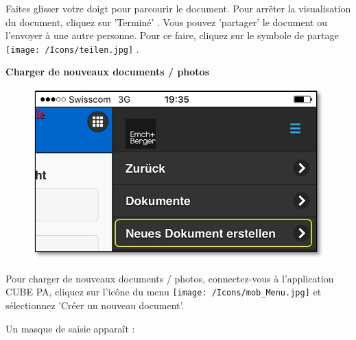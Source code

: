 Faites glisser votre doigt pour parcourir le document. Pour arrêter la visualisation du document, cliquez sur 'Terminé' . Vous pouvez 'partager' le document ou l'envoyer à une autre personne. Pour ce faire, cliquez sur le symbole de partage \texttt{[image: /Icons/teilen.jpg]} .

\pagebreak

\textbf{Charger de nouveaux documents / photos}

\vspace{\baselineskip}

\begin{figure}   %
  \vspace{-35pt}      %
  \begin{center}
    \includegraphics[width=1\linewidth]{../chapters/11_Dokumentenablage/pictures/11-mob03_Dokumente_hochladen.jpg}
  \end{center}
 \vspace{-20pt}
  \vspace{-10pt}
\end{figure}

Pour charger de nouveaux documents / photos, connectez-vous à l'application CUBE PA, cliquez sur l’icône du menu \texttt{[image: /Icons/mob\_Menu.jpg]} et sélectionnez 'Créer un nouveau document'.

\vspace{\baselineskip}

Un masque de saisie apparaît :

\vspace{\baselineskip}
\vspace{\baselineskip}

